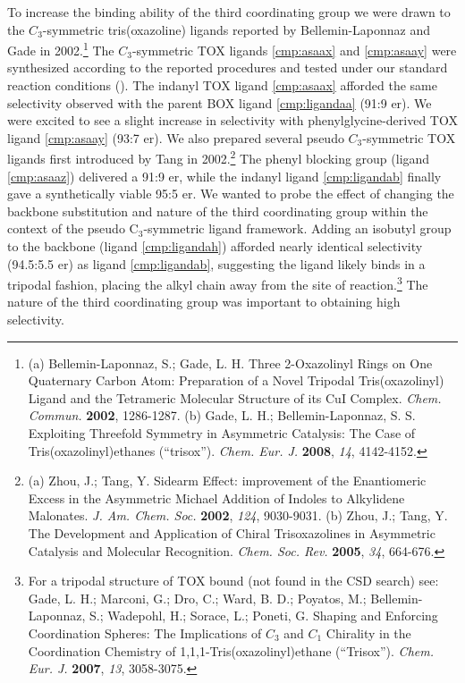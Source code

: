 To increase the binding ability of the third coordinating group we were drawn to the $C_3$-symmetric
tris(oxazoline) ligands reported by Bellemin-Laponnaz and Gade in 2002.\footnote{(a) {\frenchspacing
Bellemin-Laponnaz, S.; Gade, L.
H.
Three 2-Oxazolinyl Rings on One Quaternary Carbon Atom: Preparation of a Novel Tripodal Tris(oxazolinyl)
Ligand and the Tetrameric Molecular Structure of its CuI Complex. \textit{Chem. Commun.}
\textbf{2002}, 1286-1287.} (b) {\frenchspacing Gade, L. H.; Bellemin-Laponnaz, S. S. Exploiting
Threefold Symmetry in Asymmetric Catalysis: The Case of Tris(oxazolinyl)ethanes (``trisox'').
\textit{Chem. Eur. J.} \textbf{2008}, \textit{14}, 4142-4152.}} The $C_3$-symmetric TOX ligands
\ref{cmp:asaax} and \ref{cmp:asaay} were synthesized according to the reported procedures and tested
under our standard reaction conditions (). The
indanyl TOX ligand \ref{cmp:asaax} afforded the same selectivity observed with the parent BOX
ligand \ref{cmp:ligandaa} (91:9 er). We were excited to see a
slight increase in selectivity with phenylglycine-derived TOX ligand \ref{cmp:asaay} (93:7 er).  We
also prepared several pseudo $C_3$-symmetric TOX ligands first introduced by Tang in
2002.\footnote{(a) {\frenchspacing Zhou, J.; Tang, Y. Sidearm Effect:
improvement of the Enantiomeric Excess in the Asymmetric Michael Addition of Indoles to Alkylidene Malonates. \textit{J. Am. Chem.
Soc.} \textbf{2002}, \textit{124}, 9030-9031.} (b) {\frenchspacing Zhou, J.; Tang, Y. The
Development and Application of Chiral Trisoxazolines in Asymmetric Catalysis and Molecular
Recognition. \textit{Chem. Soc. Rev.} \textbf{2005}, \textit{34}, 664-676.}} The phenyl blocking
group (ligand \ref{cmp:asaaz}) delivered a 91:9 er, while the indanyl ligand \ref{cmp:ligandab}
finally gave a synthetically viable 95:5 er. We wanted to probe the effect of changing the backbone
substitution and nature of the third coordinating group within the context of the pseudo
C$_3$-symmetric ligand framework. Adding an isobutyl group to the backbone (ligand
\ref{cmp:ligandah}) afforded nearly identical selectivity (94.5:5.5 er) as ligand
\ref{cmp:ligandab}, suggesting the ligand likely binds in a tripodal fashion, placing the alkyl chain away from the site of
reaction.\footnote{For a tripodal structure of TOX bound  (not found in the CSD search)
see:
{\frenchspacing Gade, L.
H.; Marconi, G.; Dro, C.; Ward, B.
D.; Poyatos, M.; Bellemin-Laponnaz, S.; Wadepohl, H.; Sorace, L.; Poneti, G. Shaping and Enforcing Coordination
Spheres: The Implications of $C_3$ and $C_1$ Chirality in the Coordination Chemistry of 1,1,1-Tris(oxazolinyl)ethane (``Trisox''). \textit{Chem. Eur. J.} \textbf{2007}, \textit{13}, 3058-3075.}} The nature of the third coordinating group was important to obtaining high selectivity.
